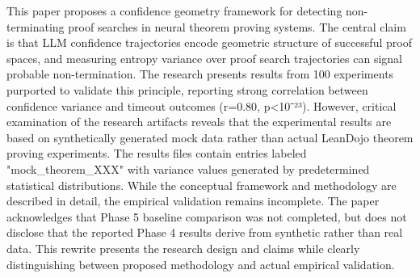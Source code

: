 
This paper proposes a confidence geometry framework for detecting non-terminating proof searches in neural theorem proving systems. The central claim is that LLM confidence trajectories encode geometric structure of successful proof spaces, and measuring entropy variance over proof search trajectories can signal probable non-termination. The research presents results from 100 experiments purported to validate this principle, reporting strong correlation between confidence variance and timeout outcomes (r=0.80, p<10⁻²³). However, critical examination of the research artifacts reveals that the experimental results are based on synthetically generated mock data rather than actual LeanDojo theorem proving experiments. The results files contain entries labeled "mock_theorem_XXX" with variance values generated by predetermined statistical distributions. While the conceptual framework and methodology are described in detail, the empirical validation remains incomplete. The paper acknowledges that Phase 5 baseline comparison was not completed, but does not disclose that the reported Phase 4 results derive from synthetic rather than real data. This rewrite presents the research design and claims while clearly distinguishing between proposed methodology and actual empirical validation.
